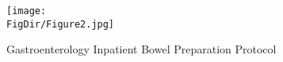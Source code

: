 \hypertarget{Gastroenterology Inpatient Bowel Preparation Protocol}{}
\begin{figure}
    \centerline{\texttt{[image: \\FigDir/Figure2.jpg]}}
    \caption{Gastroenterology Inpatient Bowel Preparation Protocol}
    \label{fig:protocol}
\end{figure} 